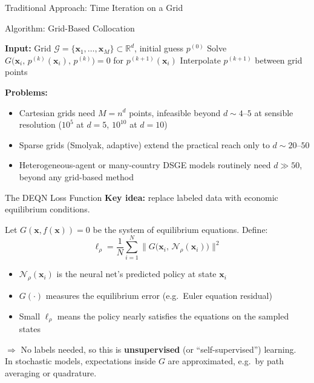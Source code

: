 \documentclass[aspectratio=169,11pt]{beamer}
\newcommand{\emphc}[1]{\textcolor{harvardcrimson}{#1}}
\newcommand{\x}{\bm{x}}
\newcommand{\R}{\mathbb{R}}
\begin{document}
\begin{frame}{Traditional Approach: Time Iteration on a Grid}
\begin{alertblock}{Algorithm: Grid-Based Collocation}
\begin{algorithmic}
\small
\STATE \textbf{Input:} Grid $\mathcal{G} = \{\x_1, \ldots, \x_M\} \subset \R^d$, initial guess $p^{(0)}$
    \FOR{each grid point $\x_i \in \mathcal{G}$}
        \STATE Solve $G\bigl(\x_i,\, p^{(k)}(\x_i),\, p^{(k)}\bigr) = 0$ for $p^{(k+1)}(\x_i)$
    \ENDFOR
    \STATE Interpolate $p^{(k+1)}$ between grid points
\ENDFOR
\end{algorithmic}
\end{alertblock}

\vspace{0.3em}
\textbf{Problems:}
\begin{itemize}
    \item \emphc{Cartesian} grids need $M=n^d$ points, infeasible beyond $d\sim4\text{--}5$ at sensible resolution ($10^5$ at $d\!=\!5$, $10^{10}$ at $d\!=\!10$)
    \item \emphc{Sparse grids} (Smolyak, adaptive) extend the practical reach only to $d \sim 20\text{--}50$
    \item Heterogeneous-agent or many-country DSGE models routinely need $d \gg 50$, beyond any grid-based method
\end{itemize}
\end{frame}

\begin{frame}{The DEQN Loss Function}
\textbf{Key idea:} replace labeled data with \emphc{economic equilibrium conditions}.

\vspace{0.5em}
Let $G(\x, f(\x)) = 0$ be the system of equilibrium equations. Define:
\[
\boxed{
\ell_\rho = \frac{1}{N} \sum_{i=1}^{N} \bigl\| G\bigl(\x_i,\, \mathcal{N}_\rho(\x_i)\bigr) \bigr\|^2
}
\]

\vspace{0.3em}
\begin{itemize}
    \item $\mathcal{N}_\rho(\x_i)$ is the neural net's \emphc{predicted policy} at state $\x_i$
    \item $G(\cdot)$ measures the \emphc{equilibrium error} (e.g.\ Euler equation residual)
    \item Small $\ell_\rho$ means the policy nearly satisfies the equations on the sampled states
\end{itemize}

\vspace{0.5em}
$\Rightarrow$ \emphc{No labels needed}, so this is \textbf{unsupervised} (or ``self-supervised'') learning.
\\[2pt]
{\scriptsize In stochastic models, expectations inside $G$ are approximated, e.g.\ by path averaging or quadrature.}
\end{frame}
\end{document}
